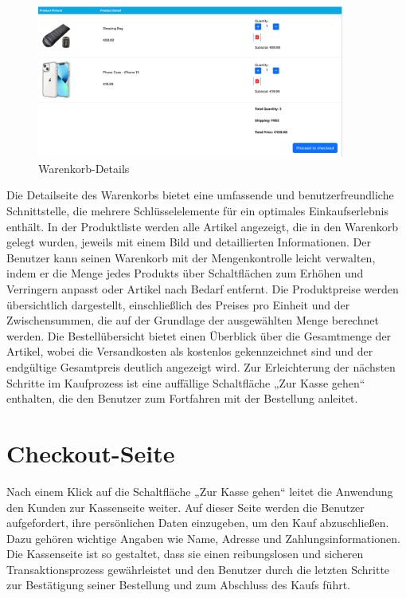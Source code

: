 \begin{figure}[H]  
	\centering %
	\includegraphics[width=0.9\textwidth]{Images/Cart-Details.png} 
	\caption{Warenkorb-Details} 
	\label{fig:sample2-image} 
\end{figure}

Die Detailseite des Warenkorbs bietet eine umfassende und benutzerfreundliche Schnittstelle, die mehrere Schlüsselelemente für ein optimales Einkaufserlebnis enthält. In der Produktliste werden alle Artikel angezeigt, die in den Warenkorb gelegt wurden, jeweils mit einem Bild und detaillierten Informationen. Der Benutzer kann seinen Warenkorb mit der Mengenkontrolle leicht verwalten, indem er die Menge jedes Produkts über Schaltflächen zum Erhöhen und Verringern anpasst oder Artikel nach Bedarf entfernt. Die Produktpreise werden übersichtlich dargestellt, einschließlich des Preises pro Einheit und der Zwischensummen, die auf der Grundlage der ausgewählten Menge berechnet werden. Die Bestellübersicht bietet einen Überblick über die Gesamtmenge der Artikel, wobei die Versandkosten als kostenlos gekennzeichnet sind und der endgültige Gesamtpreis deutlich angezeigt wird. Zur Erleichterung der nächsten Schritte im Kaufprozess ist eine auffällige Schaltfläche „Zur Kasse gehen“ enthalten, die den Benutzer zum Fortfahren mit der Bestellung anleitet.


\section{Checkout-Seite}
Nach einem Klick auf die Schaltfläche „Zur Kasse gehen“ leitet die Anwendung den Kunden zur Kassenseite weiter. Auf dieser Seite werden die Benutzer aufgefordert, ihre persönlichen Daten einzugeben, um den Kauf abzuschließen. Dazu gehören wichtige Angaben wie Name, Adresse und Zahlungsinformationen. Die Kassenseite ist so gestaltet, dass sie einen reibungslosen und sicheren Transaktionsprozess gewährleistet und den Benutzer durch die letzten Schritte zur Bestätigung seiner Bestellung und zum Abschluss des Kaufs führt.

